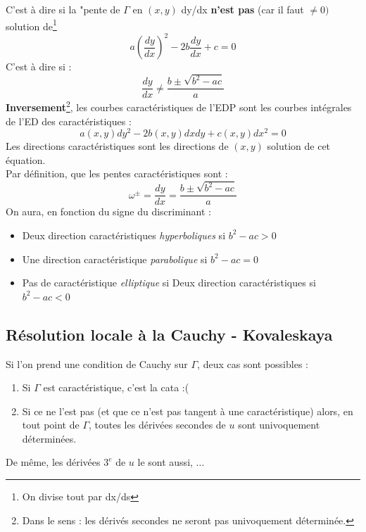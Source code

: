 \documentclass	[11pt, a4paper, openany]{book}
\begin{document}
C'est à dire si la "pente de $\Gamma$ en $(x,y)$ dy/dx \textbf{n'est pas} (car il faut $\neq 0)$ solution de\footnote{On divise tout par dx/ds}
\begin{equation}
a\left(\dfrac{dy}{dx}\right)^2 - 2b\dfrac{dy}{dx} + c = 0
\end{equation}
C'est à dire si :
\begin{equation}
\dfrac{dy}{dx} \neq \dfrac{b\pm \sqrt{b^2-ac}}{a}
\end{equation}
\textbf{Inversement}\footnote{Dans le sens : les dérivés secondes ne seront pas univoquement déterminée.}, les courbes caractéristiques de l'EDP sont les courbes intégrales de l'ED des caractéristiques :
\begin{equation}
a(x,y)dy^2 - 2b(x,y)dxdy + c(x,y)dx^2 = 0
\end{equation}
Les directions caractéristiques sont les directions de $(x,y)$ solution de cet équation.\\Par définition, que les pentes caractéristiques sont :
\begin{equation}
\omega^\pm = \dfrac{dy}{dx} = \dfrac{b\pm \sqrt{b^2-ac}}{a}
\end{equation}
On aura, en fonction du signe du discriminant :
\begin{itemize}
\item Deux direction caractéristiques \textit{hyperboliques} si $b^2-ac > 0$
\item Une direction caractéristique \textit{parabolique} si $b^2-ac = 0$
\item Pas de caractéristique \textit{elliptique} si Deux direction caractéristiques si $b^2-ac < 0$
\end{itemize}

\subsection{Résolution locale à la Cauchy - Kovaleskaya}
Si l'on prend une condition de Cauchy sur $\Gamma$, deux cas sont possibles :
\begin{enumerate}
\item Si $\Gamma$ est caractéristique, c'est la cata :(
\item Si ce ne l'est pas (et que ce n'est pas tangent à une caractéristique) alors, en tout point de $\Gamma$, toutes les dérivées secondes de $u$ sont univoquement déterminées.
\end{enumerate}
De même, les dérivées $3^e$ de $u$ le sont aussi, $\dots$\\
\end{document}
